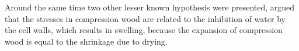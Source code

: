 Around the same time two other lesser known hypothesis were presented, \citet{hejnowicz1967some} argued that the stresses in compression
wood are related to the inhibition of water by the cell walls, which results in
swelling, because the expansion of compression wood is equal to the shrinkage
due to drying.